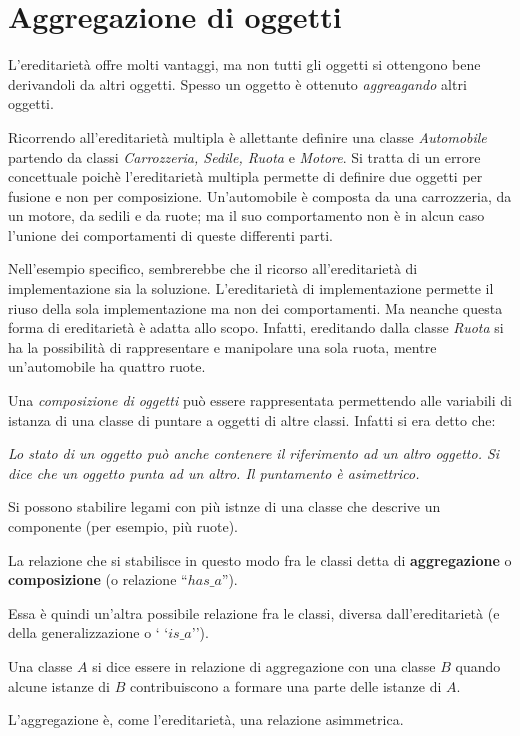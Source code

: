 \documentclass[12pt]{report}
\begin{document}
\section{Aggregazione di oggetti}
L'ereditarietà offre molti vantaggi, ma non tutti gli oggetti si ottengono bene derivandoli da altri oggetti. Spesso un oggetto è ottenuto \textit{aggreagando} altri oggetti.
\begin{example}{}{}
Ricorrendo all'ereditarietà multipla è allettante definire una classe \textit{Automobile} partendo da classi \textit{Carrozzeria, Sedile, Ruota} e \textit{Motore}. Si tratta di un errore concettuale poichè l'ereditarietà multipla permette di definire due oggetti per fusione e non per composizione. Un'automobile è composta da una carrozzeria, da un motore, da sedili e da ruote; ma il suo comportamento non è in alcun caso l'unione dei comportamenti di queste differenti parti.
\end{example}
Nell'esempio specifico, sembrerebbe che il ricorso all'ereditarietà di implementazione sia la soluzione. L'ereditarietà di implementazione permette il riuso della sola implementazione ma non dei comportamenti. Ma neanche questa forma di ereditarietà è adatta allo scopo. Infatti, ereditando dalla classe \textit{Ruota} si ha la possibilità di rappresentare e manipolare una sola ruota, mentre un'automobile ha quattro ruote.

Una \textit{composizione di oggetti} può essere rappresentata permettendo alle variabili di istanza di una classe di puntare a oggetti di altre classi. Infatti si era detto che:
\begin{center}
	\textit{Lo stato di un oggetto può anche contenere il riferimento ad un altro oggetto. Si dice che un oggetto punta ad un altro. Il puntamento è asimettrico.}
\end{center}
Si possono stabilire legami con più istnze di una classe che descrive un componente (per esempio, più ruote).

La relazione che si stabilisce in questo modo fra le classi detta di \textbf{aggregazione} o \textbf{composizione} (o relazione ``$has\_a$'').

Essa è quindi un'altra possibile relazione fra le classi, diversa dall'ereditarietà (e della generalizzazione o ` `$is\_a$'').

Una classe $A$ si dice essere in relazione di aggregazione con una classe $B$ quando alcune istanze di $B$ contribuiscono a formare una parte delle istanze di $A$.

L'aggregazione è, come l'ereditarietà, una relazione asimmetrica.
\end{document}
